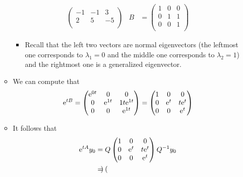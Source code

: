 \documentclass[../notes.tex]{subfiles}
\begin{document}
\begin{itemize}
\begin{itemize}
\begin{align*}
\begin{pmatrix}
                -1 & -1 & 3\\
                2 & 5 & -5\\
            \end{pmatrix}&
            B &=
            \begin{pmatrix}
                1 & 0 & 0\\
                0 & 1 & 1\\
                0 & 0 & 1\\
            \end{pmatrix}
        \end{align*}
        \begin{itemize}
            \item Recall that the left two vectors are normal eigenvectors (the leftmost one corresponds to $\lambda_1=0$ and the middle one corresponds to $\lambda_2=1$) and the rightmost one is a generalized eigenvector.
        \end{itemize}
        \item We can compute that
        \begin{equation*}
            \e[tB] =
            \begin{pmatrix}
                \e[0t] & 0 & 0\\
                0 & \e[1t] & 1t\e[1t]\\
                0 & 0 & \e[1t]\\
            \end{pmatrix}
            =
            \begin{pmatrix}
                1 & 0 & 0\\
                0 & \e[t] & t\e[t]\\
                0 & 0 & \e[t]\\
            \end{pmatrix}
        \end{equation*}
        \item It follows that
        \begin{align*}
            \e[tA]y_0 &= Q
            \begin{pmatrix}
                1 & 0 & 0\\
                0 & \e[t] & t\e[t]\\
                0 & 0 & \e[t]\\
            \end{pmatrix}
            Q^{-1}y_0\\
            &=
            \begin{pmatrix}

\end{pmatrix}
\end{align*}
\end{itemize}
\end{itemize}
\end{document}
